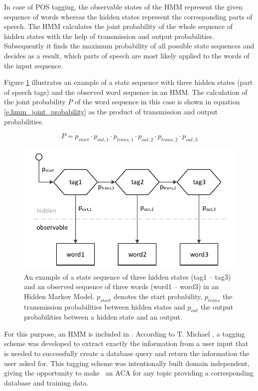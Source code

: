 In case of POS tagging, the observable states of the HMM represent the given sequence of words whereas the hidden states represent the corresponding parts of speech. The HMM calculates the joint probability of the whole sequence of hidden states with the help of transmission and output probabilities. Subsequently it finds the maximum probability of all possible state sequences and decides as a result, which parts of speech are most likely applied to the words of the input sequence.

Figure \ref{f.hmm_structure} illustrates an example of a state sequence with three hidden states (part of speech tags) and the observed word sequence in an HMM. The calculation of the joint probability $P$ of the word sequence in this case is shown in equation \ref{e.hmm_joint_probability} as the product of transmission and output probabilities.

\begin{equation}
    P = p_{start}\cdot p_{out,1}\cdot p_{trans,1}\cdot p_{out,2}\cdot p_{trans,2}\cdot p_{out,3} \label{e.hmm_joint_probability}
\end{equation}


\begin{figure}[H]
	\includegraphics[width=\textwidth]{images/hmm_structure}
	\caption[Structure of a Hidden Markov Model]{An example of a state sequence of three hidden states (tag1 -- tag3) and an observed sequence of three words (word1 -- word3) in an Hidden Markov Model. $p_{start}$ denotes the start probability, $p_{trans}$ the transmission probabilities between hidden states and $p_{out}$ the output probabilities between a hidden state and an output.}
	\label{f.hmm_structure}
\end{figure}

For this purpose, an HMM is included in \Alex. According to T. Michael \cite{michael2016}, a tagging scheme was developed to extract exactly the information from a user input that is needed to successfully create a database query and return the information the user asked for. This tagging scheme was intentionally built domain independent, giving the opportunity to make \Alex\ an ACA for any topic providing a corresponding database and training data.

